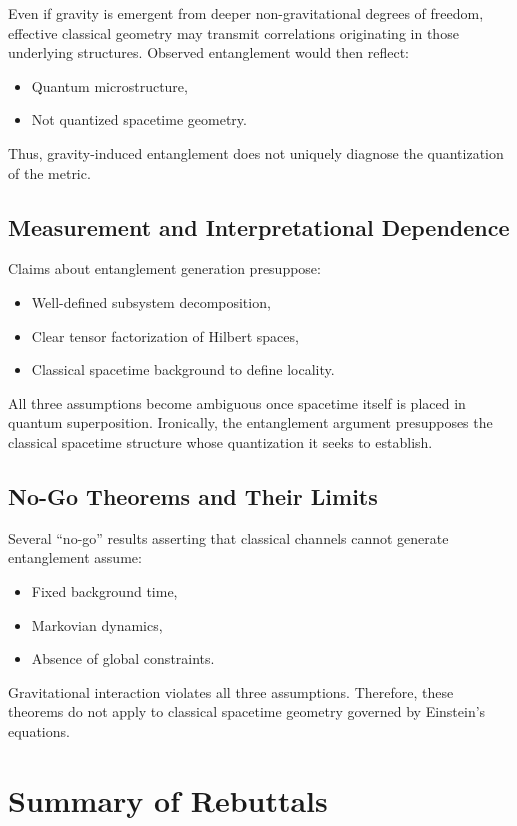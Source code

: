 \documentclass[12pt]{article}
\begin{document}
Even if gravity is emergent from deeper non-gravitational degrees of freedom,
effective classical geometry may transmit correlations originating in those
underlying structures. Observed entanglement would then reflect:
\begin{itemize}
    \item Quantum microstructure,
    \item Not quantized spacetime geometry.
\end{itemize}

Thus, gravity-induced entanglement does not uniquely diagnose the quantization
of the metric.

\subsection{Measurement and Interpretational Dependence}

Claims about entanglement generation presuppose:
\begin{itemize}
    \item Well-defined subsystem decomposition,
    \item Clear tensor factorization of Hilbert spaces,
    \item Classical spacetime background to define locality.
\end{itemize}

All three assumptions become ambiguous once spacetime itself is placed in
quantum superposition. Ironically, the entanglement argument presupposes the
classical spacetime structure whose quantization it seeks to establish.

\subsection{No-Go Theorems and Their Limits}

Several ``no-go'' results asserting that classical channels cannot generate
entanglement assume:
\begin{itemize}
    \item Fixed background time,
    \item Markovian dynamics,
    \item Absence of global constraints.
\end{itemize}

Gravitational interaction violates all three assumptions. Therefore, these
theorems do not apply to classical spacetime geometry governed by Einstein's
equations.

\section{Summary of Rebuttals}
\end{document}
